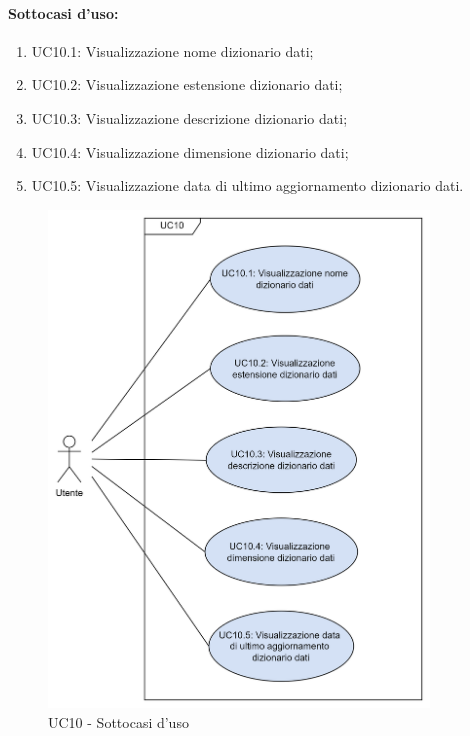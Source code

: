 \paragraph*{Sottocasi d'uso:}
\begin{enumerate}
  \item UC10.1: Visualizzazione nome dizionario dati;
  \item UC10.2: Visualizzazione estensione dizionario dati;
  \item UC10.3: Visualizzazione descrizione dizionario dati;
  \item UC10.4: Visualizzazione dimensione dizionario dati;
  \item UC10.5: Visualizzazione data di ultimo aggiornamento dizionario dati.
\end{enumerate}

\begin{figure}[H]
  \centering
  \includegraphics[width=0.90\textwidth]{assets/uc10.png}
  \caption{UC10 - Sottocasi d'uso}
\end{figure}


